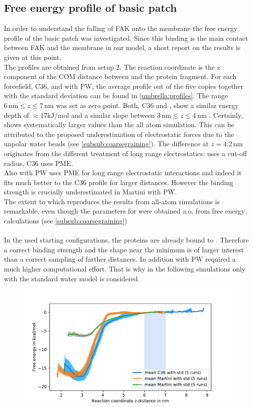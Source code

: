 \subsection{Free energy profile of basic patch}
\label{results:umbrella}
In order to understand the falling of FAK onto the membrane the free energy profile of the basic patch \pip{} was investigated. Since this binding is the main contact between FAK and the membrane in our model, a short report on the results is given at this point.\\
The profiles are obtained from setup 2. The reaction coordinate is the z component of the COM distance between \pip{} and the protein fragment. For each forcefield, C36, \martini{} and \martini{} with PW, the average profile out of the five copies together with the standard deviation can be found in \autoref{umbrella:profiles}. The range $6\,\si{\nano\metre} \le z \le 7\,\si{\nano\metre}$ was set as zero point.
Both, C36 and \martini{}, show a similar energy depth of $\approx 17 \si{\kilo\joule/\mole}$ and a similar slope between $3\,\si{\nano\metre} \le z \le 4\,\si{\nano\metre}$ . Certainly, \martini{} shows systematically larger values than the all atom simulation. This can be attributed to the proposed underestimation of electrostatic forces due to the unpolar water beads (see \autoref{subsub:coarsegraining}). The difference at $z = 4.2\,\si{\nano\metre}$ originates from the different treatment of long range electrostatics: \martini{} uses a cut-off radius, C36 uses PME.\\ %
Also \martini{} with PW uses PME for long range electrostatic interactions and indeed it fits much better to the C36 profile for larger distances. However the binding strength is crucially underestimated in Martini with PW.\\
The extent to which \martini{} reproduces the results from all-atom simulations is remarkable, even though the parameters for \martini{} were obtained a.o. from free energy calculations (see \autoref{subsub:coarsegraining})\\
\\
In the used starting configurations, the proteins are already bound to \pip{}. Therefore a correct binding strength and the shape near the minimum is of larger interest than a correct sampling of farther distances. In addition \martini{} with PW required a much higher computational effort. That is why in the following simulations only \martini{} with the standard water model is considered.
%
%
%
\begin{figure}
	\centering
	\includegraphics[width=.8\textwidth]{figures/results/umbrella}
	\label{umbrella:profiles}
\end{figure}
%
%
%
